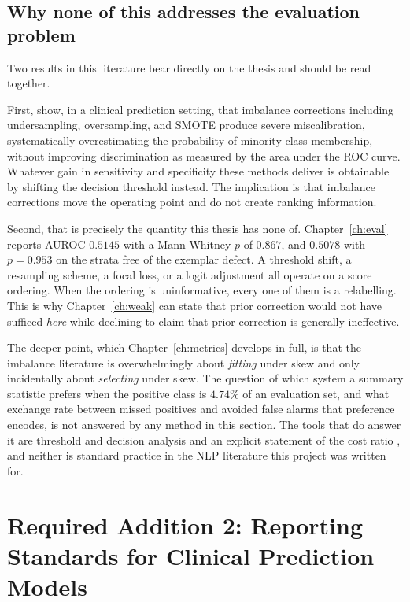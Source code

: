 \subsection{Why none of this addresses the evaluation problem}

Two results in this literature bear directly on the thesis and should be read
together.

First, \citet{vandengoorbergh2022harm} show, in a clinical prediction setting,
that imbalance corrections including undersampling, oversampling, and SMOTE
produce severe miscalibration, systematically overestimating the probability of
minority-class membership, without improving discrimination as measured by the
area under the ROC curve. Whatever gain in sensitivity and specificity these
methods deliver is obtainable by shifting the decision threshold instead. The
implication is that imbalance corrections move the operating point and do not
create ranking information.

Second, that is precisely the quantity this thesis has none of.
Chapter~\ref{ch:eval} reports AUROC $0.5145$ with a Mann-Whitney $p$ of $0.867$,
and $0.5078$ with $p = 0.953$ on the strata free of the exemplar defect. A
threshold shift, a resampling scheme, a focal loss, or a logit adjustment all
operate on a score ordering. When the ordering is uninformative, every one of
them is a relabelling. This is why Chapter~\ref{ch:weak} can state that prior
correction would not have sufficed \emph{here} while declining to claim that
prior correction is generally ineffective.

The deeper point, which Chapter~\ref{ch:metrics} develops in full, is that the
imbalance literature is overwhelmingly about \emph{fitting} under skew and only
incidentally about \emph{selecting} under skew. The question of which system a
summary statistic prefers when the positive class is $4.74\%$ of an evaluation
set, and what exchange rate between missed positives and avoided false alarms
that preference encodes, is not answered by any method in this section. The
tools that do answer it are threshold and decision analysis
\citep{vickers2006dca} and an explicit statement of the cost ratio
\citep{elkan2001cost}, and neither is standard practice in the NLP literature
this project was written for.

\section{Required Addition 2: Reporting Standards for Clinical Prediction Models}
\label{sec:bg-tripod}

